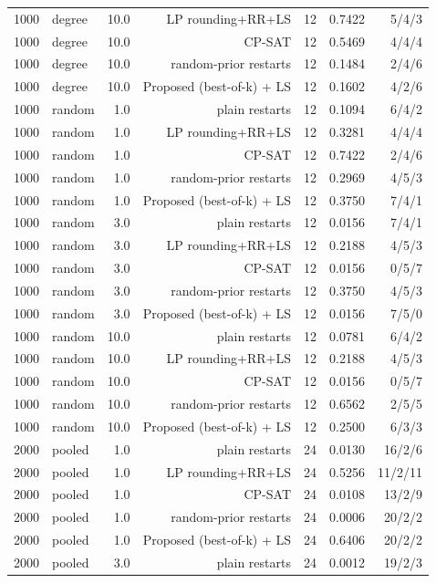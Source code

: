 \begin{table}[t]
\begin{tabular}{llrrrrr}
1000 & degree & 10.0 & LP rounding+RR+LS & 12 & 0.7422 & 5/4/3 \\
1000 & degree & 10.0 & CP-SAT & 12 & 0.5469 & 4/4/4 \\
1000 & degree & 10.0 & random-prior restarts & 12 & 0.1484 & 2/4/6 \\
1000 & degree & 10.0 & Proposed (best-of-k) + LS & 12 & 0.1602 & 4/2/6 \\
1000 & random & 1.0 & plain restarts & 12 & 0.1094 & 6/4/2 \\
1000 & random & 1.0 & LP rounding+RR+LS & 12 & 0.3281 & 4/4/4 \\
1000 & random & 1.0 & CP-SAT & 12 & 0.7422 & 2/4/6 \\
1000 & random & 1.0 & random-prior restarts & 12 & 0.2969 & 4/5/3 \\
1000 & random & 1.0 & Proposed (best-of-k) + LS & 12 & 0.3750 & 7/4/1 \\
1000 & random & 3.0 & plain restarts & 12 & 0.0156 & 7/4/1 \\
1000 & random & 3.0 & LP rounding+RR+LS & 12 & 0.2188 & 4/5/3 \\
1000 & random & 3.0 & CP-SAT & 12 & 0.0156 & 0/5/7 \\
1000 & random & 3.0 & random-prior restarts & 12 & 0.3750 & 4/5/3 \\
1000 & random & 3.0 & Proposed (best-of-k) + LS & 12 & 0.0156 & 7/5/0 \\
1000 & random & 10.0 & plain restarts & 12 & 0.0781 & 6/4/2 \\
1000 & random & 10.0 & LP rounding+RR+LS & 12 & 0.2188 & 4/5/3 \\
1000 & random & 10.0 & CP-SAT & 12 & 0.0156 & 0/5/7 \\
1000 & random & 10.0 & random-prior restarts & 12 & 0.6562 & 2/5/5 \\
1000 & random & 10.0 & Proposed (best-of-k) + LS & 12 & 0.2500 & 6/3/3 \\
2000 & pooled & 1.0 & plain restarts & 24 & 0.0130 & 16/2/6 \\
2000 & pooled & 1.0 & LP rounding+RR+LS & 24 & 0.5256 & 11/2/11 \\
2000 & pooled & 1.0 & CP-SAT & 24 & 0.0108 & 13/2/9 \\
2000 & pooled & 1.0 & random-prior restarts & 24 & 0.0006 & 20/2/2 \\
2000 & pooled & 1.0 & Proposed (best-of-k) + LS & 24 & 0.6406 & 20/2/2 \\
2000 & pooled & 3.0 & plain restarts & 24 & 0.0012 & 19/2/3 \\

\end{tabular}
\end{table}
